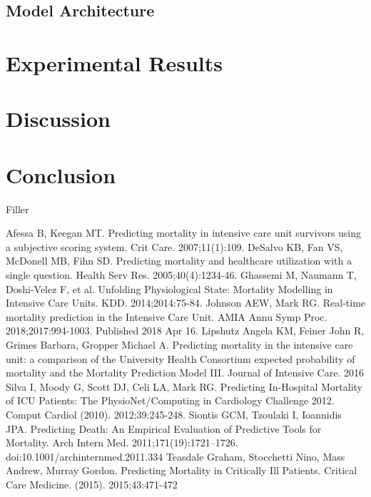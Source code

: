 \documentclass[12pt, final]{article}
\begin{document}
\subsection{Model Architecture}
\label{Model Architecture}


\section{Experimental Results}
\label{Experimental Results}

\section{Discussion}
\label{Discussion}

\section{Conclusion}
\label{Conclusion}
Filler

  \begin{thebibliography}{1}
     Afessa B, Keegan MT. Predicting mortality in intensive care unit survivors using a subjective scoring system. Crit Care. 2007;11(1):109.   
     DeSalvo KB, Fan VS, McDonell MB, Fihn SD. Predicting mortality and healthcare utilization with a single question. Health Serv Res. 2005;40(4):1234-46. 
     Ghassemi M, Naumann T, Doshi-Velez F, et al. Unfolding Physiological State: Mortality Modelling in Intensive Care Units. KDD. 2014;2014:75-84.
     Johnson AEW, Mark RG. Real-time mortality prediction in the Intensive Care Unit. AMIA Annu Symp Proc. 2018;2017:994-1003. Published 2018 Apr 16.
     Lipshutz Angela KM, Feiner John R, Grimes Barbara, Gropper Michael A. Predicting mortality in the intensive care unit: a comparison of the University Health Consortium expected probability of mortality and the Mortality Prediction Model III. Journal of Intensive Care. 2016
     Silva I, Moody G, Scott DJ, Celi LA, Mark RG. Predicting In-Hospital Mortality of ICU Patients: The PhysioNet/Computing in Cardiology Challenge 2012. Comput Cardiol (2010). 2012;39:245-248.
	 Siontis GCM, Tzoulaki I, Ioannidis JPA. Predicting Death: An Empirical Evaluation of Predictive Tools for Mortality. Arch Intern Med. 2011;171(19):1721–1726. doi:10.1001/archinternmed.2011.334
	 Teasdale Graham, Stocchetti Nino, Mass Andrew, Murray Gordon. Predicting Mortality in Critically Ill Patients. Critical Care Medicine. (2015). 2015;43:471-472
  
  \end{thebibliography}
\end{document}
